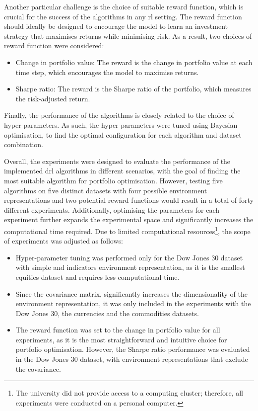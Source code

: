 Another particular challenge is the choice of suitable reward function, which is crucial for the success of the algorithms in any \acrshort{rl} setting. The reward function should ideally be designed to encourage the model to learn an investment strategy that maximises returns while minimising risk. As a result, two choices of reward function were considered:
\begin{itemize}
    \item Change in portfolio value: The reward is the change in portfolio value at each time step, which encourages the model to maximise returns.
    \item Sharpe ratio: The reward is the Sharpe ratio of the portfolio, which measures the risk-adjusted return.
\end{itemize}

Finally, the performance of the algorithms is closely related to the choice of hyper-parameters. As such, the hyper-parameters were tuned using Bayesian optimisation, to find the optimal configuration for each algorithm and dataset combination.

Overall, the experiments were designed to evaluate the performance of the implemented \acrshort{drl} algorithms in different scenarios, with the goal of finding the most suitable algorithm for portfolio optimisation. However, testing five algorithms on five distinct datasets with four possible environment representations and two potential reward functions would result in a total of forty different experiments. Additionally, optimising the parameters for each experiment further expands the experimental space and significantly increases the computational time required. Due to limited computational resources\footnote{The university did not provide access to a computing cluster; therefore, all experiments were conducted on a personal computer.}, the scope of experiments was adjusted as follows:
\begin{itemize}
    \item Hyper-parameter tuning was performed only for the Dow Jones 30 dataset with simple and indicators environment representation, as it is the smallest equities dataset and requires less computational time.
    \item Since the covariance matrix, significantly increases the dimensionality of the environment representation, it was only included in the experiments with the Dow Jones 30, the currencies and the commodities datasets.
    \item The reward function was set to the change in portfolio value for all experiments, as it is the most straightforward and intuitive choice for portfolio optimisation. However, the Sharpe ratio performance was evaluated in the Dow Jones 30 dataset, with environment representations that exclude the covariance.
\end{itemize}

